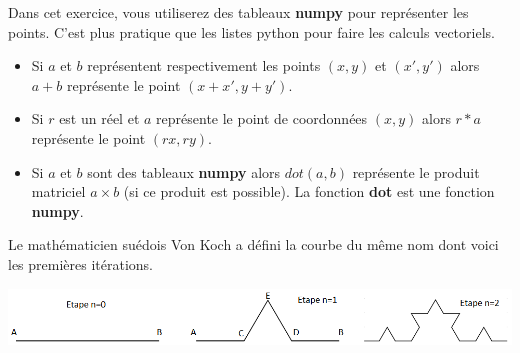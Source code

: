 \documentclass[t,10pt]{article}
\begin{document}
Dans cet exercice, vous utiliserez des tableaux \textbf{numpy} pour représenter les points. C'est plus pratique que les 
listes python pour faire les calculs vectoriels.

\begin{itemize}
\item Si $a$ et $b$ représentent respectivement les points $(x,y)$ et $(x',y')$ alors $a+b$ représente le point 
$(x+x',y+y')$.
\item Si $r$ est un réel et $a$ représente le point de coordonnées $(x,y)$ alors $r*a$ représente le point $(rx,ry)$.
\item Si $a$ et $b$ sont des tableaux \textbf{numpy} alors $dot(a,b)$ représente le produit matriciel $a\times b$ (si ce 
produit est possible). La fonction \textbf{dot} est une fonction \textbf{numpy}.
\end{itemize}

Le mathématicien suédois Von Koch a défini la courbe du même nom dont voici les premières itérations.

\begin{center}
\includegraphics[width=.95\linewidth]{images/etapes_flocon}
\end{center}







\end{document}
